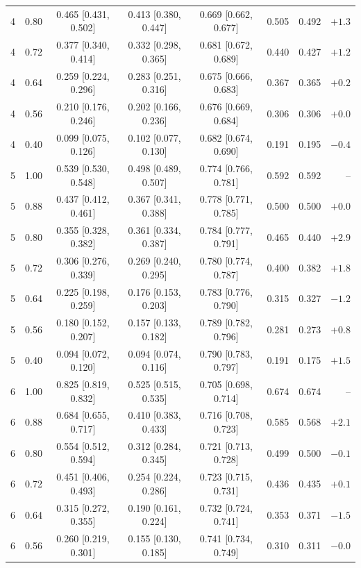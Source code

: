\begin{longtable}{cccccccr}
4 & 0.80 & 0.465 [0.431, 0.502] & 0.413 [0.380, 0.447] & 0.669 [0.662, 0.677] & 0.505 & 0.492 & $+1.3$\\
4 & 0.72 & 0.377 [0.340, 0.414] & 0.332 [0.298, 0.365] & 0.681 [0.672, 0.689] & 0.440 & 0.427 & $+1.2$\\
4 & 0.64 & 0.259 [0.224, 0.296] & 0.283 [0.251, 0.316] & 0.675 [0.666, 0.683] & 0.367 & 0.365 & $+0.2$\\
4 & 0.56 & 0.210 [0.176, 0.246] & 0.202 [0.166, 0.236] & 0.676 [0.669, 0.684] & 0.306 & 0.306 & $+0.0$\\
4 & 0.40 & 0.099 [0.075, 0.126] & 0.102 [0.077, 0.130] & 0.682 [0.674, 0.690] & 0.191 & 0.195 & $-0.4$\\
\midrule
5 & 1.00 & 0.539 [0.530, 0.548] & 0.498 [0.489, 0.507] & 0.774 [0.766, 0.781] & 0.592 & 0.592 & --\\
5 & 0.88 & 0.437 [0.412, 0.461] & 0.367 [0.341, 0.388] & 0.778 [0.771, 0.785] & 0.500 & 0.500 & $+0.0$\\
5 & 0.80 & 0.355 [0.328, 0.382] & 0.361 [0.334, 0.387] & 0.784 [0.777, 0.791] & 0.465 & 0.440 & $+2.9$\\
5 & 0.72 & 0.306 [0.276, 0.339] & 0.269 [0.240, 0.295] & 0.780 [0.774, 0.787] & 0.400 & 0.382 & $+1.8$\\
5 & 0.64 & 0.225 [0.198, 0.259] & 0.176 [0.153, 0.203] & 0.783 [0.776, 0.790] & 0.315 & 0.327 & $-1.2$\\
5 & 0.56 & 0.180 [0.152, 0.207] & 0.157 [0.133, 0.182] & 0.789 [0.782, 0.796] & 0.281 & 0.273 & $+0.8$\\
5 & 0.40 & 0.094 [0.072, 0.120] & 0.094 [0.074, 0.116] & 0.790 [0.783, 0.797] & 0.191 & 0.175 & $+1.5$\\
\midrule
6 & 1.00 & 0.825 [0.819, 0.832] & 0.525 [0.515, 0.535] & 0.705 [0.698, 0.714] & 0.674 & 0.674 & --\\
6 & 0.88 & 0.684 [0.655, 0.717] & 0.410 [0.383, 0.433] & 0.716 [0.708, 0.723] & 0.585 & 0.568 & $+2.1$\\
6 & 0.80 & 0.554 [0.512, 0.594] & 0.312 [0.284, 0.345] & 0.721 [0.713, 0.728] & 0.499 & 0.500 & $-0.1$\\
6 & 0.72 & 0.451 [0.406, 0.493] & 0.254 [0.224, 0.286] & 0.723 [0.715, 0.731] & 0.436 & 0.435 & $+0.1$\\
6 & 0.64 & 0.315 [0.272, 0.355] & 0.190 [0.161, 0.224] & 0.732 [0.724, 0.741] & 0.353 & 0.371 & $-1.5$\\
6 & 0.56 & 0.260 [0.219, 0.301] & 0.155 [0.130, 0.185] & 0.741 [0.734, 0.749] & 0.310 & 0.311 & $-0.0$\\

\end{longtable}
